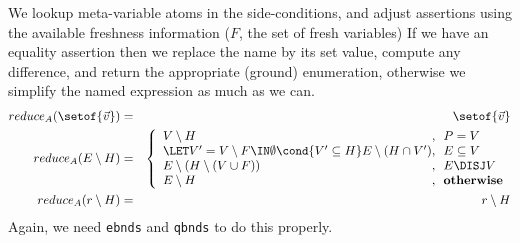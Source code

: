 We lookup meta-variable atoms in the side-conditions,
and adjust assertions using the available freshness information
($F$, the set of fresh variables)
If we have an equality assertion
then we replace the name by its set value,
compute any difference, and return the appropriate (ground) enumeration,
otherwise we simplify the named expression as much as we can.
\begin{eqnarray*}
   reduce_A(\setof{\vec v}) &=& \setof{\vec v}
\\ reduce_A(E \setminus H) 
   &=& 
   \left\{
     \begin{array}{l@{,~~}l}
       V \setminus H &  P=V 
     \\
      \LET V' = V \setminus F \IN \emptyset \cond{V' \subseteq H} E \setminus (H\cap V')
      & E\subseteq V 
     \\
      E \setminus (H \setminus (V\cup F)) & E \DISJ V
     \\
       E \setminus H & \textbf{otherwise}
     \end{array}
   \right.
\\ reduce_A(r \setminus H) &=& r \setminus H
\end{eqnarray*} 
Again, we need \texttt{ebnds} and \texttt{qbnds} to do this properly.